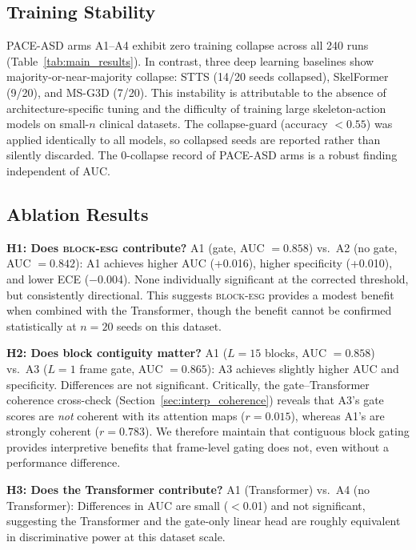 \documentclass[a4paper,fleqn]{cas-sc}
\newcommand{\besg}{\textsc{block-esg}\xspace}
\begin{document}
\subsection{Training Stability}
\label{sec:results_stability}

PACE-ASD arms A1--A4 exhibit zero training collapse across all 240 runs
(Table~\ref{tab:main_results}).
In contrast, three deep learning baselines show majority-or-near-majority
collapse: STTS (14/20 seeds collapsed), SkelFormer (9/20), and MS-G3D (7/20).
This instability is attributable to the absence of architecture-specific
tuning and the difficulty of training large skeleton-action models on
small-$n$ clinical datasets.
The collapse-guard (accuracy $< 0.55$) was applied identically to all models,
so collapsed seeds are reported rather than silently discarded.
The 0-collapse record of PACE-ASD arms is a robust finding independent of AUC.

\subsection{Ablation Results}
\label{sec:results_ablation_results}

\textbf{H1: Does \besg contribute?}
A1 (gate, AUC $= 0.858$) vs.\ A2 (no gate, AUC $= 0.842$):
A1 achieves higher AUC (+0.016), higher specificity (+0.010), and lower ECE
($-$0.004).
None individually significant at the corrected threshold, but consistently
directional.
This suggests \besg provides a modest benefit when combined with the Transformer,
though the benefit cannot be confirmed statistically at $n=20$ seeds on this
dataset.

\textbf{H2: Does block contiguity matter?}
A1 ($L=15$ blocks, AUC $= 0.858$) vs.\ A3 ($L=1$ frame gate, AUC $= 0.865$):
A3 achieves slightly higher AUC and specificity.
Differences are not significant.
Critically, the gate--Transformer coherence cross-check
(Section~\ref{sec:interp_coherence}) reveals that A3's gate scores are
\textit{not} coherent with its attention maps ($r=0.015$), whereas A1's are
strongly coherent ($r=0.783$).
We therefore maintain that contiguous block gating provides interpretive benefits
that frame-level gating does not, even without a performance difference.

\textbf{H3: Does the Transformer contribute?}
A1 (Transformer) vs.\ A4 (no Transformer):
Differences in AUC are small ($<$0.01) and not significant,
suggesting the Transformer and the gate-only linear head are roughly equivalent
in discriminative power at this dataset scale.
\end{document}
